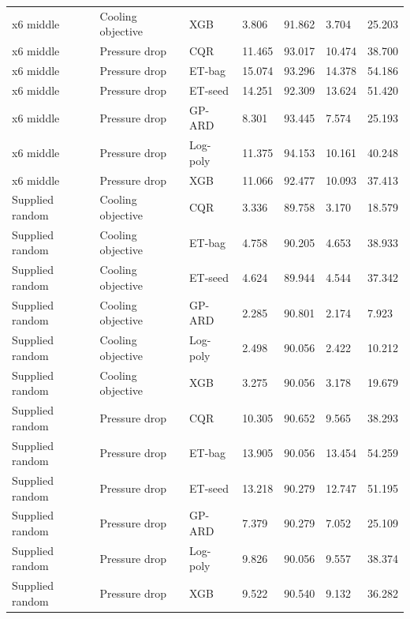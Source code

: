 \begin{longtable}{lllllll}
x6 middle & Cooling objective & XGB & 3.806 & 91.862 & 3.704 & 25.203\\
x6 middle & Pressure drop & CQR & 11.465 & 93.017 & 10.474 & 38.700\\
x6 middle & Pressure drop & ET-bag & 15.074 & 93.296 & 14.378 & 54.186\\
x6 middle & Pressure drop & ET-seed & 14.251 & 92.309 & 13.624 & 51.420\\
x6 middle & Pressure drop & GP-ARD & 8.301 & 93.445 & 7.574 & 25.193\\
x6 middle & Pressure drop & Log-poly & 11.375 & 94.153 & 10.161 & 40.248\\
x6 middle & Pressure drop & XGB & 11.066 & 92.477 & 10.093 & 37.413\\
Supplied random & Cooling objective & CQR & 3.336 & 89.758 & 3.170 & 18.579\\
Supplied random & Cooling objective & ET-bag & 4.758 & 90.205 & 4.653 & 38.933\\
Supplied random & Cooling objective & ET-seed & 4.624 & 89.944 & 4.544 & 37.342\\
Supplied random & Cooling objective & GP-ARD & 2.285 & 90.801 & 2.174 & 7.923\\
Supplied random & Cooling objective & Log-poly & 2.498 & 90.056 & 2.422 & 10.212\\
Supplied random & Cooling objective & XGB & 3.275 & 90.056 & 3.178 & 19.679\\
Supplied random & Pressure drop & CQR & 10.305 & 90.652 & 9.565 & 38.293\\
Supplied random & Pressure drop & ET-bag & 13.905 & 90.056 & 13.454 & 54.259\\
Supplied random & Pressure drop & ET-seed & 13.218 & 90.279 & 12.747 & 51.195\\
Supplied random & Pressure drop & GP-ARD & 7.379 & 90.279 & 7.052 & 25.109\\
Supplied random & Pressure drop & Log-poly & 9.826 & 90.056 & 9.557 & 38.374\\
Supplied random & Pressure drop & XGB & 9.522 & 90.540 & 9.132 & 36.282\\
\bottomrule\end{longtable}\endgroup
